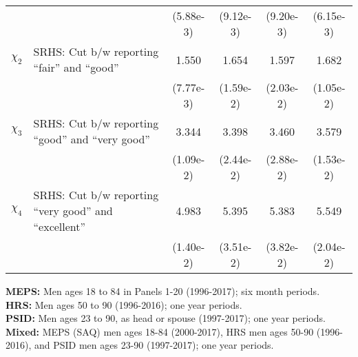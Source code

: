 \begin{table}[H]
\begin{center}
{\begin{tabular}{clcccc}
 & & (5.88e-3) & (9.12e-3) & (9.20e-3) & (6.15e-3) \\
$\chi_2$ & SRHS: Cut b/w reporting ``fair'' and ``good'' & 1.550 & 1.654 & 1.597 & 1.682 \\
 & & (7.77e-3) & (1.59e-2) & (2.03e-2) & (1.05e-2) \\
$\chi_3$ & SRHS: Cut b/w reporting ``good'' and ``very good'' & 3.344 & 3.398 & 3.460 & 3.579 \\
 & & (1.09e-2) & (2.44e-2) & (2.88e-2) & (1.53e-2) \\
$\chi_4$ & SRHS: Cut b/w reporting ``very good'' and ``excellent'' & 4.983 & 5.395 & 5.383 & 5.549 \\
 & & (1.40e-2) & (3.51e-2) & (3.82e-2) & (2.04e-2) \\
\hline\hline
\end{tabular}
 } 
 \usebox{\MenParamsBox}  
\settowidth\TableWidth{\usebox{\MenParamsBox}} %
\vspace{0.0cm} \parbox{\TableWidth}{
  \begin{flushleft}
\textbf{MEPS:} Men ages 18 to 84 in Panels 1-20 (1996-2017); six month periods.\\
\textbf{HRS:} Men ages 50 to 90 (1996-2016); one year periods.\\
\textbf{PSID:} Men ages 23 to 90, as head or spouse (1997-2017); one year periods.\\
\textbf{Mixed:} MEPS (SAQ) men ages 18-84 (2000-2017), HRS men ages 50-90 (1996-2016), and PSID men ages 23-90 (1997-2017); one year periods.\\
  \end{flushleft}
}
\end{center}
\end{table}
